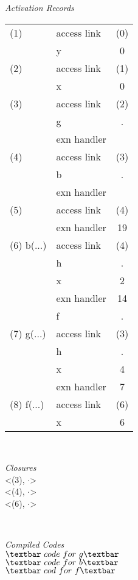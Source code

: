\documentclass{paper}
\begin{document}
	\begin{minipage}{.45\textwidth}
	\centering
	\textit{Activation Records}\\
	\begin{tabular}{l|l|c}
	\hline
	(1) 		& access link 	& (0) 	\\ 	\cline{2-3}
    			& y 				& 0		\\
	\hline
	(2)		& access link 	& (1) 	\\	\cline{2-3}
   			& x				& 0	 	\\
	\hline
	(3) 	  	& access link 	& (2)		\\ 	\cline{2-3}
 			& g				& .		\\	\cline{2-3}
 			& exn handler  	& 		\\
 	\hline 
 	(4) 		&	access link & (3)	\\	\cline{2-3}
 			& 	b			& .		\\	\cline{2-3}
 			&	exn handler & 		\\
 	\hline
 	(5) 		& 	access link & (4)		\\	\cline{2-3}
 			& 	exn handler	& 19		\\	\cline{2-3}
 	\hline
 	(6) b(...)& access link 	& (4)		\\	\cline{2-3}
 			& h	 			&  .			\\	\cline{2-3}
 			& x				& 2			\\	\cline{2-3}
 			& exn handler   & 14			\\	\cline{2-3}
 			& f 				& . 			\\
 	\hline
 	(7) g(...)& access link 	& (3)		\\	\cline{2-3}
 			& h				& .		\\	\cline{2-3}
 			& x 				& 4		\\	\cline{2-3}
 			& exn handler 	& 7  	\\	
	\hline
	(8) f(...)& access link	& (6)	\\	\cline{2-3}
			& x				& 6		\\
	\hline
	\end{tabular}
\end{minipage}
\makeatletter\
\begin{minipage}{.3\textwidth}
\centering
\textit{Closures}\\
<(3), $\cdot$> \\
<(4), $\cdot$> \\
<(6), $\cdot$>
\end{minipage}
\makeatletter\
\begin{minipage}{.2\textwidth}
\centering
\textit{Compiled Codes}\\
$\textbar\ code\ for\ g \textbar $\\
$\textbar\ code\ for\ b \textbar $\\
$\textbar\ cod\ for\ f \textbar $
\end{minipage}
\end{document}
